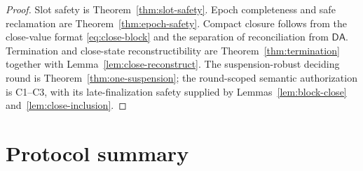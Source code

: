 \documentclass[11pt]{article}
\theoremstyle{definition}
\theoremstyle{remark}
\newcommand{\DA}{\mathsf{DA}}
\begin{document}
\begin{proof}
Slot safety is Theorem~\ref{thm:slot-safety}. Epoch completeness and safe reclamation are Theorem~\ref{thm:epoch-safety}. Compact closure follows from the close-value format \eqref{eq:close-block} and the separation of reconciliation from $\DA$. Termination and close-state reconstructibility are Theorem~\ref{thm:termination} together with Lemma~\ref{lem:close-reconstruct}. The suspension-robust deciding round is Theorem~\ref{thm:one-suspension}; the round-scoped semantic authorization is C1--C3, with its late-finalization safety supplied by Lemmas~\ref{lem:block-close} and~\ref{lem:close-inclusion}.
\end{proof}

\section{Protocol summary}
\end{document}

